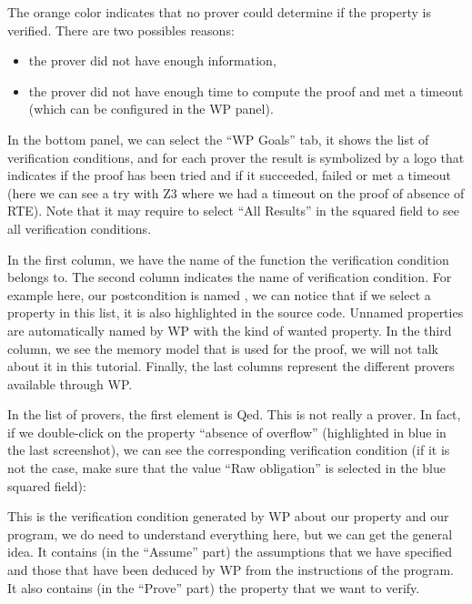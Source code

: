 The orange color indicates that no prover could determine if the
property is verified. There are two possibles reasons:



\begin{itemize}
\item the prover did not have enough information,
\item the prover did not have enough time to compute the proof and
  met a timeout (which can be configured in the WP panel).
\end{itemize}


In the bottom panel, we can select the ``WP Goals'' tab, it shows the list of
verification conditions, and for each prover the result is symbolized
by a logo that indicates if the proof has been tried and if it
succeeded, failed or met a timeout (here we can see a try with
Z3 where we had a timeout on the proof of absence of RTE). Note that it
may require to select ``All Results'' in the squared field to see all
verification conditions.




In the first column, we have the name of the function the verification
condition belongs to. The second column indicates the name of verification
condition. For example here, our postcondition is named
, we can notice
that if we select a property in this list, it is also highlighted in the
source code. Unnamed properties are automatically named by WP with the
kind of wanted property. In the third column, we see the memory model
that is used for the proof, we will not talk about it in this tutorial.
Finally, the last columns represent the different provers available
through WP.



In the list of provers, the first element is Qed. This is not really a prover.
In fact, if we double-click on the property ``absence of overflow''
(highlighted in blue in the last screenshot), we can see the corresponding
verification condition (if it is not the case, make sure that the value ``Raw
obligation'' is selected in the blue squared field):





This is the verification condition generated by WP about our property and our
program, we do need to understand everything here, but we can get the
general idea. It contains (in the ``Assume'' part) the assumptions that
we have specified and those that have been deduced by WP from the
instructions of the program. It also contains (in the ``Prove'' part)
the property that we want to verify.



